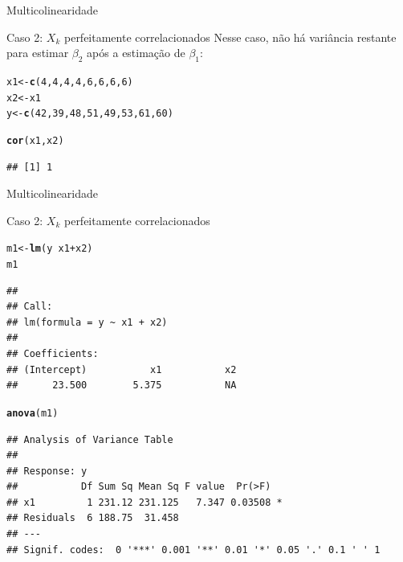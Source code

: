 \documentclass{beamer}\usepackage[]{graphicx}\usepackage[]{color}
\makeatletter
\newcommand{\hlnum}[1]{\textcolor[rgb]{0.686,0.059,0.569}{#1}}%
\newcommand{\hlopt}[1]{\textcolor[rgb]{0,0,0}{#1}}%
\newcommand{\hlstd}[1]{\textcolor[rgb]{0.345,0.345,0.345}{#1}}%
\newcommand{\hlkwb}[1]{\textcolor[rgb]{0.69,0.353,0.396}{#1}}%
\newcommand{\hlkwd}[1]{\textcolor[rgb]{0.737,0.353,0.396}{\textbf{#1}}}%
\newenvironment{kframe}{%
 \def\at@end@of@kframe{}%
 \ifinner\ifhmode%
  \def\at@end@of@kframe{\end{minipage}}%
  \begin{minipage}{\columnwidth}%
 \fi\fi%
 \def\FrameCommand##1{\hskip\@totalleftmargin \hskip-\fboxsep
 \colorbox{shadecolor}{##1}\hskip-\fboxsep
     \hskip-\linewidth \hskip-\@totalleftmargin \hskip\columnwidth}%
 \MakeFramed {\advance\hsize-\width
   \@totalleftmargin\z@ \linewidth\hsize
   \@setminipage}}%
 {\par\unskip\endMakeFramed%
 \at@end@of@kframe}
\newenvironment{knitrout}{}{} %
\renewenvironment{knitrout}{\setlength{\topsep}{0mm}}{}
\makeatother
\begin{document}
\begin{frame}[fragile]{Multicolinearidade}

Caso 2: $X_k$ perfeitamente correlacionados
\vfill
Nesse caso, não há variância restante para estimar $\beta _2$ após a estimação de $\beta _1$:
\vfill
\begin{knitrout}\tiny
{}\color{fgcolor}\begin{kframe}
\begin{alltt}
\hlstd{x1} \hlkwb{<-} \hlkwd{c}\hlstd{(}\hlnum{4}\hlstd{,}\hlnum{4}\hlstd{,}\hlnum{4}\hlstd{,}\hlnum{4}\hlstd{,}\hlnum{6}\hlstd{,}\hlnum{6}\hlstd{,}\hlnum{6}\hlstd{,}\hlnum{6}\hlstd{)}
\hlstd{x2} \hlkwb{<-} \hlstd{x1}
\hlstd{y} \hlkwb{<-} \hlkwd{c}\hlstd{(}\hlnum{42}\hlstd{,}\hlnum{39}\hlstd{,}\hlnum{48}\hlstd{,}\hlnum{51}\hlstd{,}\hlnum{49}\hlstd{,}\hlnum{53}\hlstd{,}\hlnum{61}\hlstd{,}\hlnum{60}\hlstd{)}

\hlkwd{cor}\hlstd{(x1,x2)}
\end{alltt}
\begin{verbatim}
## [1] 1
\end{verbatim}
\end{kframe}
\end{knitrout}

\end{frame}


\begin{frame}[fragile]{Multicolinearidade}

Caso 2: $X_k$ perfeitamente correlacionados
\vfill

\begin{knitrout}\tiny
{}\color{fgcolor}\begin{kframe}
\begin{alltt}
\hlstd{m1} \hlkwb{<-} \hlkwd{lm}\hlstd{(y} \hlopt{~} \hlstd{x1} \hlopt{+} \hlstd{x2)}
\hlstd{m1}
\end{alltt}
\begin{verbatim}
## 
## Call:
## lm(formula = y ~ x1 + x2)
## 
## Coefficients:
## (Intercept)           x1           x2  
##      23.500        5.375           NA
\end{verbatim}
\begin{alltt}
\hlkwd{anova}\hlstd{(m1)}
\end{alltt}
\begin{verbatim}
## Analysis of Variance Table
## 
## Response: y
##           Df Sum Sq Mean Sq F value  Pr(>F)  
## x1         1 231.12 231.125   7.347 0.03508 *
## Residuals  6 188.75  31.458                  
## ---
## Signif. codes:  0 '***' 0.001 '**' 0.01 '*' 0.05 '.' 0.1 ' ' 1
\end{verbatim}
\end{kframe}
\end{knitrout}

\end{frame}
\end{document}
